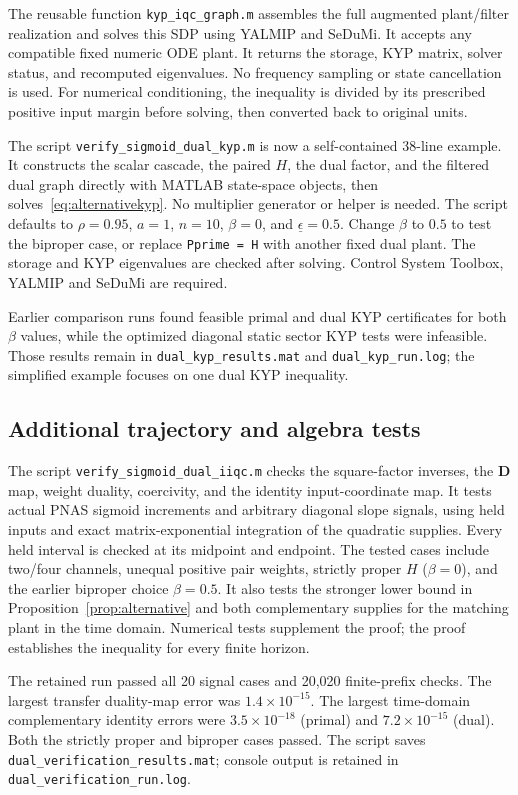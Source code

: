 The reusable function \texttt{kyp\_iqc\_graph.m} assembles the full augmented plant/filter realization and solves this SDP using YALMIP and SeDuMi. It accepts any compatible fixed numeric ODE plant. It returns the storage, KYP matrix, solver status, and recomputed eigenvalues. No frequency sampling or state cancellation is used. For numerical conditioning, the inequality is divided by its prescribed positive input margin before solving, then converted back to original units.

The script \texttt{verify\_sigmoid\_dual\_kyp.m} is now a self-contained 38-line example. It constructs the scalar cascade, the paired $H$, the dual factor, and the filtered dual graph directly with MATLAB state-space objects, then solves~\eqref{eq:alternativekyp}. No multiplier generator or helper is needed. The script defaults to $\rho=0.95$, $a=1$, $n=10$, $\beta=0$, and $\underline\epsilon=0.5$. Change $\beta$ to $0.5$ to test the biproper case, or replace \texttt{Pprime = H} with another fixed dual plant. The storage and KYP eigenvalues are checked after solving. Control System Toolbox, YALMIP and SeDuMi are required.

Earlier comparison runs found feasible primal and dual KYP certificates for both $\beta$ values, while the optimized diagonal static sector KYP tests were infeasible. Those results remain in \texttt{dual\_kyp\_results.mat} and \texttt{dual\_kyp\_run.log}; the simplified example focuses on one dual KYP inequality.

\subsection{Additional trajectory and algebra tests}
The script \texttt{verify\_sigmoid\_dual\_iiqc.m} checks the square-factor inverses, the $\mathbf D$ map, weight duality, coercivity, and the identity input-coordinate map. It tests actual PNAS sigmoid increments and arbitrary diagonal slope signals, using held inputs and exact matrix-exponential integration of the quadratic supplies. Every held interval is checked at its midpoint and endpoint. The tested cases include two/four channels, unequal positive pair weights, strictly proper $H$ ($\beta=0$), and the earlier biproper choice $\beta=0.5$. It also tests the stronger lower bound in Proposition~\ref{prop:alternative} and both complementary supplies for the matching plant in the time domain. Numerical tests supplement the proof; the proof establishes the inequality for every finite horizon.

The retained run passed all 20 signal cases and 20,020 finite-prefix checks. The largest transfer duality-map error was $1.4\times10^{-15}$. The largest time-domain complementary identity errors were $3.5\times10^{-18}$ (primal) and $7.2\times10^{-15}$ (dual). Both the strictly proper and biproper cases passed. The script saves \texttt{dual\_verification\_results.mat}; console output is retained in \texttt{dual\_verification\_run.log}.
